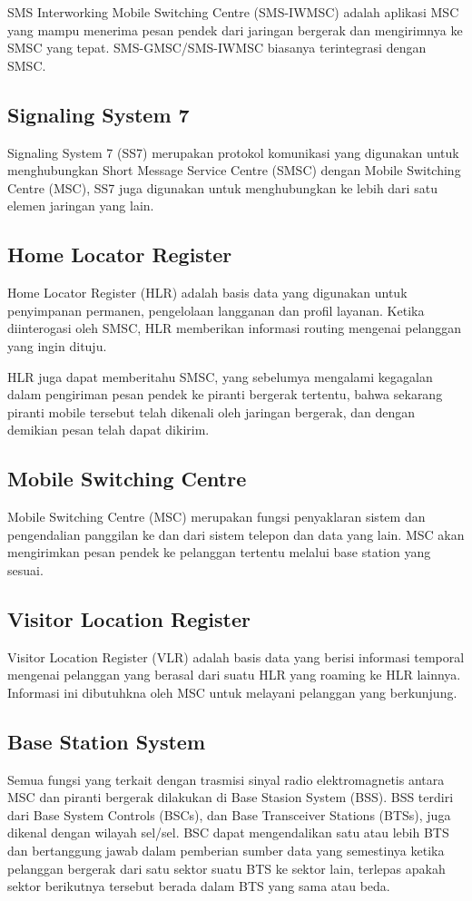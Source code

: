 \documentclass{jtetiproposalskripsi}
\begin{document}
SMS Interworking Mobile Switching Centre (SMS-IWMSC) adalah aplikasi MSC yang mampu menerima pesan pendek dari jaringan bergerak dan mengirimnya ke SMSC yang tepat. SMS-GMSC/SMS-IWMSC biasanya terintegrasi dengan SMSC.

\subsection{Signaling System 7}
Signaling System 7 (SS7) merupakan protokol komunikasi yang digunakan untuk menghubungkan Short Message Service Centre (SMSC) dengan Mobile Switching Centre (MSC), SS7 juga  digunakan untuk menghubungkan ke lebih dari satu elemen  jaringan yang lain.

\subsection{Home Locator Register}
Home Locator Register (HLR) adalah basis data yang digunakan untuk penyimpanan permanen, pengelolaan langganan dan profil layanan. Ketika diinterogasi oleh SMSC, HLR memberikan informasi routing mengenai pelanggan yang ingin dituju.

HLR juga dapat memberitahu SMSC, yang sebelumya mengalami kegagalan dalam pengiriman pesan pendek  ke piranti bergerak tertentu, bahwa sekarang piranti mobile tersebut telah dikenali oleh jaringan bergerak, dan dengan demikian pesan telah dapat dikirim.

\subsection{Mobile Switching Centre}
Mobile Switching Centre (MSC) merupakan fungsi penyaklaran sistem dan pengendalian panggilan ke dan dari sistem telepon dan data yang lain. MSC akan mengirimkan pesan pendek ke pelanggan tertentu melalui base station yang sesuai.

\subsection{Visitor Location Register}
Visitor Location Register (VLR) adalah basis data yang berisi informasi temporal mengenai pelanggan yang berasal dari suatu HLR yang roaming ke HLR lainnya. Informasi ini dibutuhkna oleh MSC untuk melayani pelanggan yang berkunjung.

\subsection{Base Station System}
Semua fungsi yang terkait dengan trasmisi sinyal radio elektromagnetis antara MSC dan piranti bergerak dilakukan di Base Stasion System (BSS). BSS terdiri dari Base System Controls (BSCs), dan Base Transceiver Stations (BTSs), juga dikenal dengan wilayah sel/sel.
BSC dapat mengendalikan satu atau lebih BTS dan bertanggung jawab dalam pemberian sumber data yang semestinya ketika pelanggan bergerak dari satu sektor suatu BTS ke sektor lain, terlepas apakah sektor  berikutnya tersebut berada dalam BTS yang sama atau beda.
\end{document}
